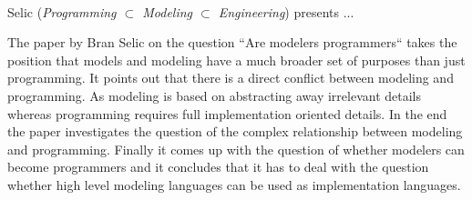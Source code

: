 

\ \hline \ %

Selic
\cite{isola-2016-selic}
({\em Programming $\subset$ Modeling $\subset$ Engineering})
presents ...




The paper by Bran Selic on the question “Are modelers programmers“ takes the position that models and modeling have a much broader set of purposes than just programming. It points out that there is a direct conflict between modeling and programming. As modeling is based on abstracting away irrelevant details whereas programming requires full implementation oriented details. In the end the paper investigates the question of the complex relationship between modeling and programming. Finally it comes up with the question of whether modelers can become programmers and it concludes that it has to deal with the question whether high level modeling languages can be used as implementation languages.
 
